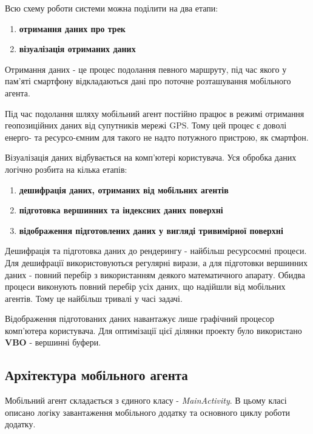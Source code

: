 \documentclass[simple,a4paper,14pt,ukrainian,utf8]{eskdtext}
\begin{document}
    Всю схему роботи системи можна поділити на два етапи:
    
    \begin{enumerate}
    	\item \textbf{отримання даних про трек}
    	\item \textbf{візуалізація отриманих даних}
    \end{enumerate}
    
    Отримання даних - це процес подолання певного маршруту, під час якого у пам’яті смартфону відкладаються дані про поточне розташування мобільного агента.
    
    Під час подолання шляху мобільний агент постійно працює в режимі отримання геопозиційних даних від супутників мережі GPS. Тому цей процес є доволі енерго- та ресурсо-ємним для такого не надто потужного пристрою, як смартфон.
    
    Візуалізація даних відбувається на комп’ютері користувача. Уся обробка даних логічно розбита на кілька етапів:
    
    \begin{enumerate}
    	\item \textbf{дешифрація даних, отриманих від мобільних агентів}
    	\item \textbf{підготовка вершинних та індексних даних поверхні}
    	\item \textbf{відображення підготовлених даних у вигляді тривимірної поверхні}
    \end{enumerate}
    
    Дешифрація та підготовка даних до рендерингу - найбільш ресурсоємні процеси. Для дешифрації використовуються регулярні вирази, а для підготовки вершинних даних - повний перебір з використанням деякого математичного апарату. Обидва процеси виконують повний перебір усіх даних, що надійшли від мобільних агентів. Тому це найбільш тривалі у часі задачі.
    
    Відображення підготованих даних навантажує лише графічний процесор комп’ютера користувача. Для оптимізації цієї ділянки проекту було використано \textbf{VBO} - вершинні буфери.

	\subsection{Архітектура мобільного агента}
	
	Мобільний агент складається з єдиного класу - \textit{MainActivity}. В цьому класі описано логіку завантаження мобільного додатку та основного циклу роботи додатку.
	
\end{document}
